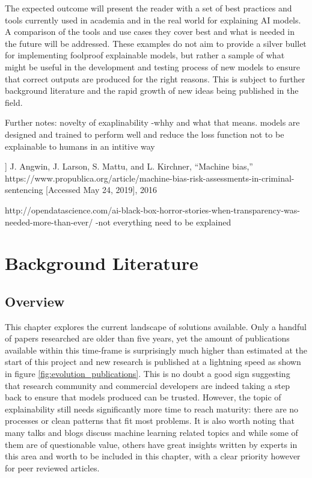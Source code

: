 \documentclass[proposal]{softeng}
\begin{document}
The expected outcome will present the reader with a set of best practices and tools currently used in academia and in the real world for explaining AI models. A comparison of the tools and use cases they cover best and what is needed in the future will be addressed. These examples do not aim to provide a silver bullet for implementing foolproof explainable models, but rather a sample of what might be useful in the development and testing process of new models to ensure that correct outputs are produced for the right reasons. This is subject to further background literature and the rapid growth of new ideas being published in the field.

Further notes:
novelty of exaplinability -whhy and what that means. models are designed and trained to perform well and reduce the loss function not to be explainable to humans in an intitive way

] J. Angwin, J. Larson, S. Mattu, and L. Kirchner, “Machine bias,”
https://www.propublica.org/article/machine-bias-risk-assessments-in-criminal-sentencing
[Accessed May 24, 2019], 2016

http://opendatascience.com/ai-black-box-horror-stories-when-transparency-was-needed-more-than-ever/
-not everything need to be explained

\newpage
\section{Background Literature}
\subsection{Overview}
This chapter explores the current landscape of solutions available. Only a handful of papers researched are older than five years, yet the amount of publications available within this time-frame is surprisingly much higher than estimated at the start of this project and new research is published at a lightning speed as shown in figure \ref{fig:evolution_publications}. This is no doubt a good sign suggesting that research community and commercial developers are indeed taking a step back to ensure that models produced can be trusted. However, the topic of explainability still needs significantly more time to reach maturity: there are no processes or clean patterns that fit most problems. It is also worth noting that many talks and blogs discuss machine learning related topics and while some of them are of questionable value, others have great insights written by experts in this area and worth to be included in this chapter, with a clear priority however for peer reviewed articles.
\end{document}
